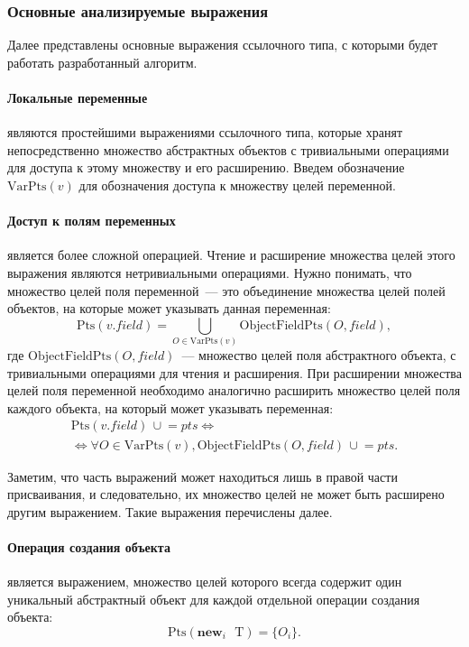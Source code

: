\documentclass[14pt,titlepage]{extarticle}
\newcommand{\NEWi}[1]{\textbf{new}_{#1}\textbf{ }}
\newcommand{\Pts}[1]{\textrm{Pts}(#1)}
\newcommand{\VPts}[1]{\textrm{VarPts}(#1)}
\newcommand{\OFPts}[2]{\textrm{ObjectFieldPts}(#1, #2)}
\newcommand{\cupe}{\,\cup\!\!=}
\begin{document}
      \subsubsection{Основные анализируемые выражения}
        \label{section:pts_providers}

        Далее представлены основные выражения ссылочного типа, с которыми будет
        работать разработанный алгоритм.

        \paragraph{Локальные переменные} являются простейшими выражениями
        ссылочного типа, которые хранят непосредственно множество абстрактных
        объектов с тривиальными операциями для доступа к этому множеству и его
        расширению. Введем обозначение $\VPts{v}$ для обозначения доступа к
        множеству целей переменной.

        \paragraph{Доступ к полям переменных} является более сложной операцией.
        Чтение и расширение множества целей этого выражения являются
        нетривиальными операциями.
        Нужно понимать, что множество целей поля переменной~--- это объединение
        множества целей полей объектов, на которые может указывать данная
        переменная:
        \[\Pts{v.field} = \bigcup\limits_{O \in \VPts{v}} \OFPts{O}{field},\]
        где $\OFPts{O}{field}$~--- множество целей поля абстрактного объекта,
        с тривиальными операциями для чтения и расширения.
        При расширении множества целей поля переменной необходимо аналогично
        расширить множество целей поля каждого объекта, на который может
        указывать переменная:
        \begin{gather*}
          \Pts{v.field} \cupe pts
          \Leftrightarrow \\ \Leftrightarrow
          \forall O \in \VPts{v}, \OFPts{O}{field} \cupe pts.
        \end{gather*}

        Заметим, что часть выражений может находиться лишь в правой части
        присваивания, и следовательно, их множество целей не может быть
        расширено другим выражением. Такие выражения перечислены далее.

        \paragraph{Операция создания объекта} является выражением, множество
        целей которого всегда содержит один уникальный абстрактный объект для
        каждой отдельной операции создания объекта:
        \[\Pts{\NEWi{i} \textrm{T}} = \{O_i\}.\]
\end{document}
